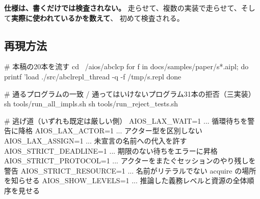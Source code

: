 \documentclass[11pt,a4paper]{ltjsarticle}
\theoremstyle{definition}
\theoremstyle{remark}
\begin{document}
\textbf{仕様は、書くだけでは検査されない。}
走らせて、複数の実装で走らせて、そして\textbf{実際に使われているかを数えて}、
初めて検査される。

\subsection*{再現方法}

\begin{term}
# 本稿の20本を流す
cd ~/aios/abclcp
for f in docs/samples/paper/s*.aipl; do
  printf 'load %
  ./src/abclrepl_thread -q -f /tmp/s.repl
done

# 通るプログラムの一致 / 通ってはいけないプログラム31本の拒否（三実装）
sh tools/run_all_impls.sh
sh tools/run_reject_tests.sh

# 逃げ道（いずれも既定は厳しい側）
AIOS_LAX_WAIT=1    ... 循環待ちを警告に降格
AIOS_LAX_ACTOR=1   ... アクター型を区別しない
AIOS_LAX_ASSIGN=1  ... 未宣言の名前への代入を許す
AIOS_STRICT_DEADLINE=1 ... 期限のない待ちをエラーに昇格
AIOS_STRICT_PROTOCOL=1 ... アクターをまたぐセッションのやり残しを警告
AIOS_STRICT_RESOURCE=1 ... 名前がリテラルでない acquire の場所を知らせる
AIOS_SHOW_LEVELS=1     ... 推論した義務レベルと資源の全体順序を見せる
\end{term}
\end{document}

